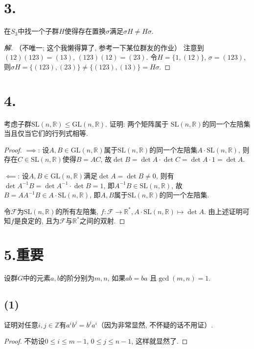 \documentclass[12pt, a4paper, fontset=windows]{ctexart}
\newcommand{\R}{\mathbb{R}}
\newcommand{\Z}{\mathbb{Z}}
\newcommand{\GL}{\mathrm{GL}}
\newcommand{\SL}{\mathrm{SL}}
\newcommand{\kh}[1]{（{#1}）} %
\newenvironment{solution}{\begin{proof}[解]}{\end{proof}}
\begin{document}
\section*{3.}

在$S_3$中找一个子群$H$使得存在置换$\sigma$满足$\sigma H\ne H\sigma$. 

\begin{solution}
\kh{不唯一; 这个我懒得算了, 参考一下某位群友的作业} 
注意到$(12)(123)=(13)$, $(123)(12)=(23)$. 令$H=\{1,(12)\}$, 
$\sigma=(123)$, 则$\sigma H=\{(123),(23)\}\ne\{(123),(13)\}=H\sigma$. 
\end{solution}

\section*{4.}
\label{GL-SL}

考虑子群$\SL(n,\R)\le\GL(n,\R)$. 证明: 两个矩阵属于
$\SL(n,\R)$的同一个左陪集当且仅当它们的行列式相等. 

\begin{proof}
$\implies$: 
设$A,B\in\GL(n,\R)$属于$\SL(n,\R)$的同一个左陪集$A\cdot\SL(n,\R)$, 
则存在$C\in\SL(n,\R)$使得$B=AC$, 故$\det B=\det A\cdot\det C=\det A\cdot 1=\det A$. 

$\impliedby$: 
设$A,B\in\GL(n,\R)$满足$\det A=\det B\ne 0$, 则有$\det A^{-1}B=\det A^{-1}\cdot\det B=1$, 
即$A^{-1}B\in\SL(n,\R)$, 故$B=AA^{-1}B\in A\cdot\SL(n,\R)$, 
即$A,B$属于$\SL(n,\R)$的同一个左陪集. 

令$\mathcal{F}$为$\SL(n,\R)$的所有左陪集, $f:\mathcal{F}\to\R^*,A\cdot\SL(n,\R)\mapsto\det A$. 
由上述证明可知$f$是良定的, 且为$\mathcal{F}$与$\R^*$之间的双射. 
\end{proof}

\section*{5.\normalsize 重要}

设群$G$中的元素$a,b$的阶分别为$m,n$, 如果$ab=ba$
且$\gcd(m,n)=1$. 

\subsection*{(1)}

证明对任意$i,j\in\Z$有$a^ib^j=b^ja^i$\kh{因为非常显然, 不怀疑的话不用证}. 

\begin{proof}
不妨设$0\le i\le m-1$, $0\le j\le n-1$, 这样就显然了. 
\end{proof}
\end{document}
